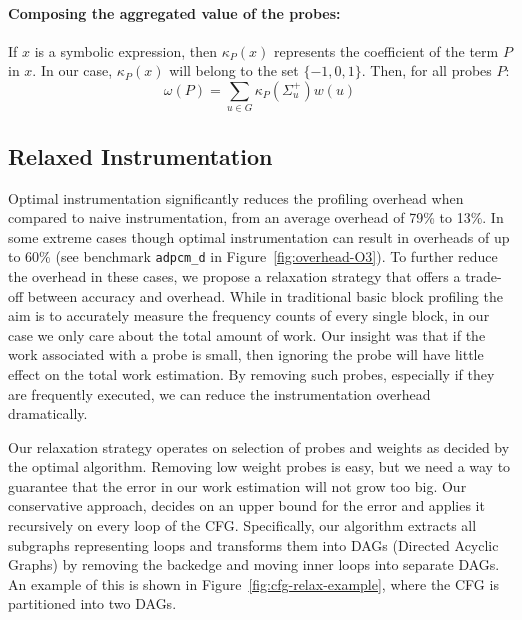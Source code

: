 \paragraph{Composing the aggregated value of the probes:}
If $x$ is a symbolic expression, then $\kappa_P(x)$ represents the coefficient
of the term $P$ in $x$.
In our case, $\kappa_P(x)$ will belong to the set $\{-1,0,1\}$.
Then, for all probes $P$:
\[
\omega(P) = \sum_{u\in G} \kappa_P(\Sigma^+_u)w(u)
\]

\subsection{Relaxed Instrumentation}

Optimal instrumentation significantly reduces the profiling overhead when compared to naive instrumentation, from an average overhead of
79\% to 13\%. In some extreme cases though optimal instrumentation can result in overheads of up to 60\% (see benchmark \texttt{adpcm\_d}
in Figure~\ref{fig:overhead-O3}). To further reduce the overhead in these cases, we propose a relaxation strategy that offers a trade-off
between accuracy and overhead. While in traditional basic block profiling the aim is to accurately measure the frequency counts of every
single block, in our case we only care about the total amount of work. Our insight was that if the work associated with a probe is small,
then ignoring the probe will have little effect on the total work estimation. By removing such probes, especially if they are frequently
executed, we can reduce the instrumentation overhead dramatically. 

Our relaxation strategy operates on selection of probes and weights as decided by the optimal algorithm. Removing low weight probes is
easy, but we need a way to guarantee that the error in our work estimation will not grow too big. Our conservative approach, decides on an
upper bound for the error and applies it recursively on every loop of the CFG. Specifically, our algorithm extracts all subgraphs
representing loops and transforms them into DAGs (Directed Acyclic Graphs) by removing the backedge and moving inner loops into separate
DAGs. An example of this is shown in Figure~\ref{fig:cfg-relax-example}, where the CFG is partitioned into two DAGs. 


